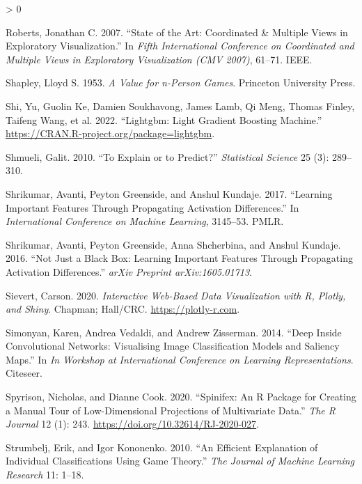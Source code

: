 \documentclass[
]{article}
\newlength{\cslhangindent}
\newenvironment{CSLReferences}[2] %
 {%
  \setlength{\parindent}{0pt}
  \ifodd #1 \everypar{\setlength{\hangindent}{\cslhangindent}}\ignorespaces\fi
  \ifnum #2 > 0
  \setlength{\parskip}{#2\baselineskip}
  \fi
 }%
 {}
\begin{document}
\begin{CSLReferences}{1}{0}
\leavevmode\hypertarget{ref-roberts_state_2007}{}%
Roberts, Jonathan C. 2007. {``State of the Art: {Coordinated} \& Multiple Views in Exploratory Visualization.''} In \emph{Fifth International Conference on Coordinated and Multiple Views in Exploratory Visualization ({CMV} 2007)}, 61--71. IEEE.

\leavevmode\hypertarget{ref-shapley_value_1953}{}%
Shapley, Lloyd S. 1953. \emph{A Value for n-Person Games}. Princeton University Press.

\leavevmode\hypertarget{ref-shi_lightgbm_2022}{}%
Shi, Yu, Guolin Ke, Damien Soukhavong, James Lamb, Qi Meng, Thomas Finley, Taifeng Wang, et al. 2022. {``Lightgbm: {Light} {Gradient} {Boosting} {Machine}.''} \url{https://CRAN.R-project.org/package=lightgbm}.

\leavevmode\hypertarget{ref-shmueli_explain_2010}{}%
Shmueli, Galit. 2010. {``To Explain or to Predict?''} \emph{Statistical Science} 25 (3): 289--310.

\leavevmode\hypertarget{ref-shrikumar_learning_2017}{}%
Shrikumar, Avanti, Peyton Greenside, and Anshul Kundaje. 2017. {``Learning Important Features Through Propagating Activation Differences.''} In \emph{International {Conference} on {Machine} {Learning}}, 3145--53. PMLR.

\leavevmode\hypertarget{ref-shrikumar_not_2016}{}%
Shrikumar, Avanti, Peyton Greenside, Anna Shcherbina, and Anshul Kundaje. 2016. {``Not Just a Black Box: {Learning} Important Features Through Propagating Activation Differences.''} \emph{arXiv Preprint arXiv:1605.01713}.

\leavevmode\hypertarget{ref-sievert_interactive_2020}{}%
Sievert, Carson. 2020. \emph{Interactive {Web}-{Based} {Data} {Visualization} with {R}, Plotly, and Shiny}. Chapman; Hall/CRC. \url{https://plotly-r.com}.

\leavevmode\hypertarget{ref-simonyan_deep_2014}{}%
Simonyan, Karen, Andrea Vedaldi, and Andrew Zisserman. 2014. {``Deep Inside Convolutional Networks: {Visualising} Image Classification Models and Saliency Maps.''} In \emph{In {Workshop} at {International} {Conference} on {Learning} {Representations}}. Citeseer.

\leavevmode\hypertarget{ref-spyrison_spinifex_2020}{}%
Spyrison, Nicholas, and Dianne Cook. 2020. {``Spinifex: An {R} {Package} for {Creating} a {Manual} {Tour} of {Low}-Dimensional {Projections} of {Multivariate} {Data}.''} \emph{The R Journal} 12 (1): 243. \url{https://doi.org/10.32614/RJ-2020-027}.

\leavevmode\hypertarget{ref-strumbelj_efficient_2010}{}%
Strumbelj, Erik, and Igor Kononenko. 2010. {``An Efficient Explanation of Individual Classifications Using Game Theory.''} \emph{The Journal of Machine Learning Research} 11: 1--18.


\end{CSLReferences}
\end{document}

